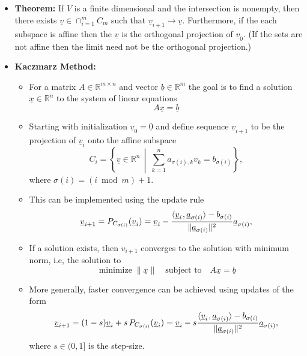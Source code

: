 \documentclass[11pt,twoside]{report}
\newcommand{\bbR}{{\mathbb{R}}}
\newcommand{\vecnot}{\underline}
\DeclareMathOperator*{\minimize}{minimize}
\newcommand{\tinner}[2]{{\langle #1 \mskip1mu , #2 \rangle}}
\begin{document}
\begin{itemize}
\begin{itemize}
\end{itemize}



\item \textbf{Theorem:} If $V$ is a finite dimensional and the intersection is nonempty,   then there exists $\vecnot{v} \in \cap_{i=1}^m C_m$ such that $\vecnot v_{i+1}  \to \vecnot{v}$.  Furthermore, if the each subspace is affine then the  $\vecnot{v}$ is the orthogonal projection of $\vecnot{v}_0$. (If the sets are not affine then the limit need not be the orthogonal projection.) 



\item \textbf{Kaczmarz Method:} 
\begin{itemize}
\item For a matrix $A\in\mathbb{R}^{m\times n}$ and vector $\vecnot b\in\mathbb{R}^{m}$ the goal is to find a solution $\vecnot{x} \in \bbR^n$ to the system of linear equations
\[
A \vecnot{x} = \vecnot{b}
\]

\item  Starting with initialization $\vecnot{v}_0 = \vecnot{0}$ and define sequence $\vecnot v_{i+1}$ to be the projection of $\vecnot v_{i}$ onto the affine subspace
\[
C_{i}=\left\{ \vecnot v\in\mathbb{R}^{n}\,\middle|\:\sum_{k=1}^{n}a_{\sigma(i),k}v_{k}=b_{\sigma(i)}\right\} ,
\]
where $\sigma(i)=(i\bmod m)+1$.

\item This can be implemented using the update rule
\begin{equation*}
\vecnot v_{i+1}=  P_{C_{\sigma(i)}} (\vecnot{v}_i) = \vecnot v_{i}- \frac{\tinner{\vecnot v_{i}}{\vecnot a_{\sigma(i)}}-b_{\sigma(i)}}{\text{\ensuremath{\|}}\vecnot a_{\sigma(i)}\|^{2}}\vecnot a_{\sigma(i)},
\end{equation*}


\item If a solution exists, then $v_{i+1}$ converges to the solution with minimum norm, i.e, the solution to 
\[
\minimize \|\vecnot{x} \| \quad \text{subject to} \quad A \vecnot{x} = \vecnot{b} 
\]
\item More generally, faster convergence can be achieved using updates of the form 
\begin{equation*}
\vecnot v_{i+1}= (1-s) \vecnot{v}_i + s \, P_{C_{\sigma(i)}} (\vecnot{v}_i) = \vecnot v_{i}- s \frac{\tinner{\vecnot v_{i}}{\vecnot a_{\sigma(i)}}-b_{\sigma(i)}}{\text{\ensuremath{\|}}\vecnot a_{\sigma(i)}\|^{2}}\vecnot a_{\sigma(i)},
\end{equation*}
where $s\in(0,1]$ is the step-size. 

\end{itemize}

\end{itemize}






 
\end{document}
